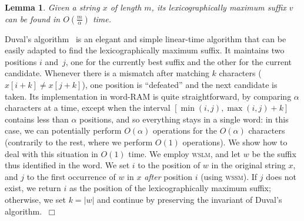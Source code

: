 \documentclass[12pt]{article}
\newtheorem{lemma}[theorem]{Lemma}
\newenvironment{proof}{\noindent{\bf Proof.\/}}{$~\Box$ \newline}
\newcommand{\C}{{\alpha}}
\newcommand{\wssm}{\textsc{wssm}}
\newcommand{\wslm}{\textsc{wslm}}
\begin{document}
\begin{lemma}
  \label{lem:maxsuff}
  Given a string $x$ of length $m$, its lexicographically maximum
  suffix $v$ can be found in $O(\frac{m}{\C})$ time.
\end{lemma}
\begin{proof}
  Duval's algorithm~\cite{du:83} is an elegant and simple linear-time
  algorithm that can be easily adapted to find the lexicographically
  maximum suffix. It maintains two positions $i$ and~$j$, one for the
  currently best suffix and the other for the current
  candidate. Whenever there is a mismatch after matching $k$
  characters ($x[i+k] \neq x[j+k]$), one position is ``defeated'' and
  the next candidate is taken. Its implementation in word-RAM is quite
  straightforward, by comparing $\C$ characters at a time, except when
  the interval $[\min(i,j), \max(i,j)+k]$ contains less than $\C$
  positions, and so everything stays in a single word: in this case,
  we can potentially perform $O(\C)$ operations for the $O(\C)$
  characters (contrarily to the rest, where we perform $O(1)$
  operations).
  We show how to deal with this situation in $O(1)$ time.
  We employ \wslm, and let $w$ be the suffix thus
  identified in the word. We set $i$ to the position of $w$ in the
  original string $x$, and $j$ to the first occurrence of $w$ in $x$
  \emph{after} position $i$ (using \wssm). If $j$ does not exist, we
  return $i$ as the position of the lexicographically maximum suffix;
  otherwise, we set $k = |w|$ and continue by preserving the invariant
  of Duval's algorithm.  
\end{proof}
\end{document}
